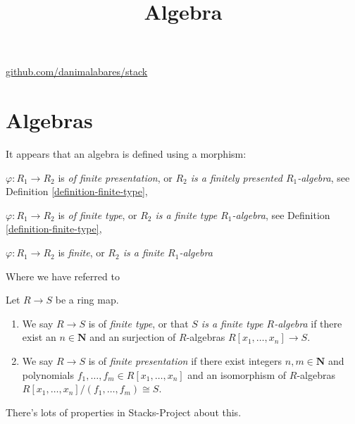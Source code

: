 



\title{Algebra}
\maketitle

\label{section-phantom}
\hfill
\href{http://github.com/danimalabares/stack}{github.com/danimalabares/stack}

\tableofcontents

\section{Algebras}
\label{section-algebras}

It appears that an algebra is defined using a morphism:

\begin{definition}
\label{definition-algebra}
\item
\label{item-ring-homomorphism-finite-presentation}
$\varphi : R_1 \to R_2$ is {\it of finite presentation}, or
{\it $R_2$ is a finitely presented $R_1$-algebra},
see Definition \ref{definition-finite-type},
\item
\label{item-ring-homomorphism-finite-type}
$\varphi : R_1 \to R_2$ is {\it of finite type}, or
{\it $R_2$ is a finite type $R_1$-algebra},
see Definition \ref{definition-finite-type},
\item
\label{item-ring-homomorphism-finite}
$\varphi : R_1 \to R_2$ is {\it finite}, or
{\it $R_2$ is a finite $R_1$-algebra}
\end{definition}

Where we have referred to

\begin{definition}
\label{definition-finite-type}
Let $R \to S$ be a ring map.
\begin{enumerate}
\item We say $R \to S$ is of {\it finite type}, or that {\it $S$ is a finite
type $R$-algebra} if there exist an $n \in \mathbf{N}$ and an surjection
of $R$-algebras $R[x_1, \ldots, x_n] \to S$.
\item We say $R \to S$ is of {\it finite presentation} if there
exist integers $n, m \in \mathbf{N}$ and polynomials
$f_1, \ldots, f_m \in R[x_1, \ldots, x_n]$
and an isomorphism of $R$-algebras
$R[x_1, \ldots, x_n]/(f_1, \ldots, f_m) \cong S$.
\end{enumerate}
\end{definition}

There's lots of properties in Stacks-Project about this.





